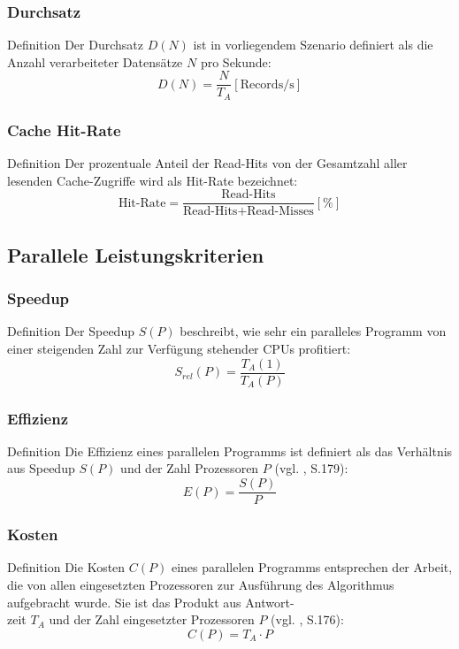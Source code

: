 \documentclass[presentation, shownotes]{beamer}
\begin{document}
\begin{frame}
\frametitle{Durchsatz}
    \begin{block}{Definition}
    Der Durchsatz $D(N)$ ist in vorliegendem Szenario definiert als die Anzahl verarbeiteter Datensätze $N$ pro Sekunde:
    $$D(N) = \frac{N}{T_A} [\text{Records/s}]$$
    \end{block}
\end{frame}

\begin{frame}
\frametitle{Cache Hit-Rate}
    \begin{block}{Definition}
    Der prozentuale Anteil der Read-Hits von der Gesamtzahl aller lesenden Cache-Zugriffe wird als Hit-Rate bezeichnet:
    $$\text{Hit-Rate} = \frac{\text{Read-Hits}}{\text{Read-Hits} + \text{Read-Misses}} [\%]$$
    \end{block}
\end{frame}

\subsection{Parallele Leistungskriterien}

\begin{frame}
\frametitle{Speedup}
    \begin{block}{Definition}
        Der Speedup $S(P)$ beschreibt, wie sehr ein paralleles Programm von einer steigenden Zahl zur Verfügung stehender CPUs profitiert:
        $$S_{rel}(P) = \frac{T_A(1)}{T_A(P)}$$
    \end{block}
\end{frame}

\begin{frame}
\frametitle{Effizienz}
    \begin{block}{Definition}
        Die Effizienz eines parallelen Programms ist definiert als das Verhältnis aus Speedup $S(P)$ und der Zahl Prozessoren $P$ (vgl. \cite{rauber2012parallele}, S.179):
    $$E(P) = \frac{S(P)}{P}$$
    \end{block}
\end{frame}

\begin{frame}
\frametitle{Kosten}
    \begin{block}{Definition}
    Die Kosten $C(P)$ eines parallelen Programms entsprechen der Arbeit, die von allen eingesetzten Prozessoren zur Ausführung des Algorithmus aufgebracht wurde. Sie ist das Produkt aus Antwort-\\
    zeit $T_A$ und der Zahl eingesetzter Prozessoren $P$ (vgl. \cite{rauber2012parallele}, S.176):
    $$C(P) = T_A \cdot P$$
    \end{block}
\end{frame}
\end{document}
